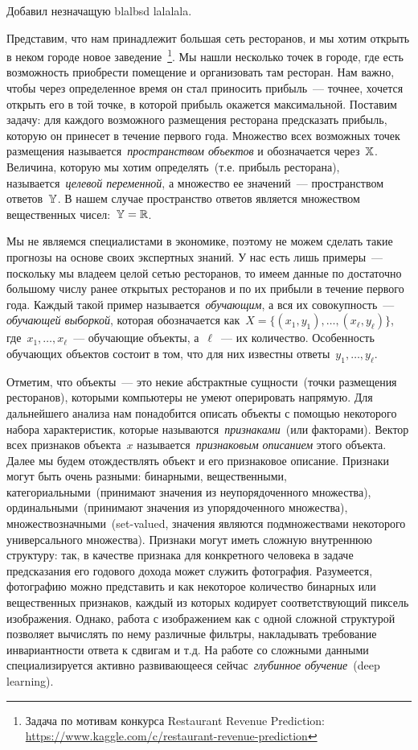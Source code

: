 \documentclass[12pt,fleqn]{article}
\begin{document}
Добавил незначащую blalbsd lalalala.

Представим, что нам принадлежит большая сеть ресторанов, и мы хотим открыть в неком
городе новое заведение~\footnote{Задача по мотивам конкурса Restaurant Revenue Prediction:
\url{https://www.kaggle.com/c/restaurant-revenue-prediction}}.
Мы нашли несколько точек в городе, где есть возможность
приобрести помещение и организовать там ресторан.
Нам важно, чтобы через определенное время он стал приносить прибыль~---
точнее, хочется открыть его в той точке, в которой прибыль окажется максимальной.
Поставим задачу: для каждого возможного размещения ресторана предсказать
прибыль, которую он принесет в течение первого года.
Множество всех возможных точек размещения называется~\emph{пространством объектов}
и обозначается через~$\mathbb{X}$.
Величина, которую мы хотим определять~(т.е. прибыль ресторана),
называется~\emph{целевой переменной}, а множество ее значений~---
пространством ответов~$\mathbb{Y}$.
В нашем случае пространство ответов является множеством вещественных
чисел:~$\mathbb{Y} = \mathbb{R}$.

Мы не являемся специалистами в экономике, поэтому не можем сделать такие
прогнозы на основе своих экспертных знаний.
У нас есть лишь примеры~--- поскольку мы владеем целой сетью ресторанов,
то имеем данные по достаточно большому числу ранее открытых ресторанов и по их
прибыли в течение первого года.
Каждый такой пример называется~\emph{обучающим}, а вся их совокупность~---
\emph{обучающей выборкой}, которая обозначается как~$X = \{(x_1, y_1), \dots, (x_\ell, y_\ell)\}$,
где~$x_1, \dots, x_\ell$~--- обучающие объекты, а~$\ell$~--- их количество.
Особенность обучающих объектов состоит в том, что для них известны ответы~$y_1, \dots, y_\ell$.

Отметим, что объекты~--- это некие абстрактные сущности~(точки размещения ресторанов),
которыми компьютеры не умеют оперировать напрямую.
Для дальнейшего анализа нам понадобится описать объекты с помощью некоторого
набора характеристик, которые называются~\emph{признаками}~(или факторами).
Вектор всех признаков объекта~$x$ называется~\emph{признаковым описанием}
этого объекта.
Далее мы будем отождествлять объект и его признаковое описание.
Признаки могут быть очень разными: бинарными, вещественными, категориальными~(принимают
значения из неупорядоченного множества), ординальными~(принимают значения
из упорядоченного множества), множествозначными~(set-valued, значения
являются подмножествами некоторого универсального множества).
Признаки могут иметь сложную внутреннюю структуру: так, в качестве признака для конкретного человека
в задаче предсказания его годового дохода может служить фотография.
Разумеется, фотографию можно представить и как некоторое количество бинарных
или вещественных признаков, каждый из которых кодирует соответствующий пиксель изображения.
Однако, работа с изображением как с одной сложной структурой позволяет
вычислять по нему различные фильтры, накладывать требование инвариантности
ответа к сдвигам и т.д.
На работе со сложными данными специализируется активно развивающееся
сейчас~\emph{глубинное обучение}~(deep learning).
\end{document}
